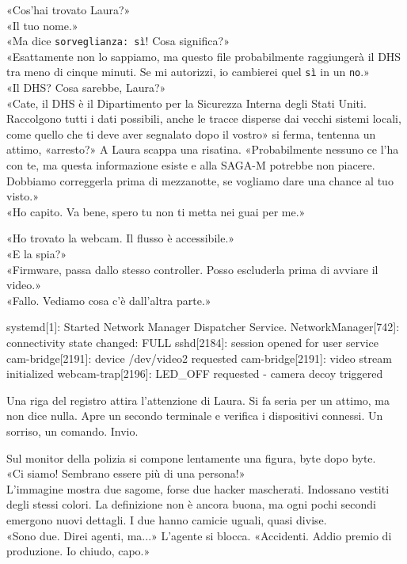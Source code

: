 «Cos'hai trovato Laura?»\\
«Il tuo nome.»\\
«Ma dice \texttt{sorveglianza: sì}! Cosa significa?»\\
«Esattamente non lo sappiamo, ma questo file probabilmente raggiungerà il DHS tra meno di cinque minuti. Se mi autorizzi, io cambierei quel \texttt{sì} in un \texttt{no}.»\\
«Il DHS? Cosa sarebbe, Laura?»\\
«Cate, il DHS \`e il Dipartimento per la Sicurezza Interna degli Stati Uniti. Raccolgono tutti i dati possibili, anche le tracce disperse dai vecchi sistemi locali, come quello che ti deve aver segnalato dopo il vostro» si ferma, tentenna un attimo, «arresto?» A Laura scappa una risatina. «Probabilmente nessuno ce l’ha con te, ma questa informazione esiste e alla SAGA-M potrebbe non piacere. Dobbiamo correggerla prima di mezzanotte, se vogliamo dare una chance al tuo visto.»\\
«Ho capito. Va bene, spero tu non ti metta nei guai per me.»\\
\separatore
\par\medskip
«Ho trovato la webcam. Il flusso \`e accessibile.»\\
«E la spia?»\\
«Firmware, passa dallo stesso controller. Posso escluderla prima di avviare il video.»\\
«Fallo. Vediamo cosa c’\`e dall’altra parte.»\\

\separatore
\begin{terminalbox}
 systemd[1]: Started Network Manager Dispatcher Service.
 NetworkManager[742]: connectivity state changed: FULL
 sshd[2184]: session opened for user service
 cam-bridge[2191]: device /dev/video2 requested
 cam-bridge[2191]: video stream initialized
  webcam-trap[2196]: LED_OFF requested - camera decoy triggered
\end{terminalbox}
Una riga del registro attira l'attenzione di Laura.
Si fa seria per un attimo, ma non dice nulla. Apre un secondo terminale e verifica i dispositivi connessi.
Un sorriso, un comando. Invio.
\separatore

Sul monitor della polizia si compone lentamente una figura, byte dopo byte.\\
«Ci siamo! Sembrano essere pi\`u di una persona!»\\
L’immagine mostra due sagome, forse due hacker mascherati. Indossano vestiti degli stessi colori. La definizione non \`e ancora buona, ma ogni pochi secondi emergono nuovi dettagli. I due hanno camicie uguali, quasi divise.\\
«Sono due. Direi agenti, ma...» L’agente si blocca. «Accidenti. Addio premio di produzione. Io chiudo, capo.»\\

